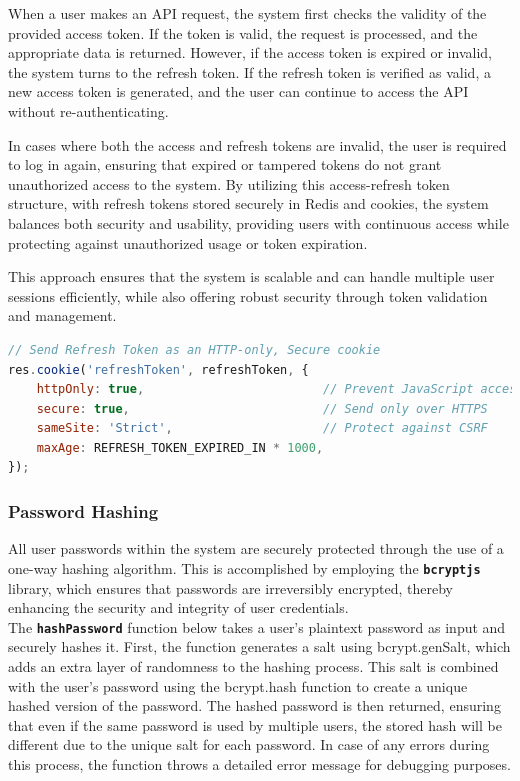 	\noindent When a user makes an API request, the system first checks the validity of the provided access token. If the token is valid, the request is processed, and the appropriate data is returned. However, if the access token is expired or invalid, the system turns to the refresh token. If the refresh token is verified as valid, a new access token is generated, and the user can continue to access the API without re-authenticating.
	
	\noindent In cases where both the access and refresh tokens are invalid, the user is required to log in again, ensuring that expired or tampered tokens do not grant unauthorized access to the system. By utilizing this access-refresh token structure, with refresh tokens stored securely in Redis and cookies, the system balances both security and usability, providing users with continuous access while protecting against unauthorized usage or token expiration.
	
	\noindent This approach ensures that the system is scalable and can handle multiple user sessions efficiently, while also offering robust security through token validation and management.

\begin{lstlisting}[language=Javascript, breaklines=true, caption=Store refresh token in secure cookie]
// Send Refresh Token as an HTTP-only, Secure cookie
res.cookie('refreshToken', refreshToken, {
	httpOnly: true,       					// Prevent JavaScript access to the cookie
	secure: true,         					// Send only over HTTPS
	sameSite: 'Strict',   					// Protect against CSRF
	maxAge: REFRESH_TOKEN_EXPIRED_IN * 1000, 
});
\end{lstlisting}

	\subsubsection{Password Hashing}
	All user passwords within the system are securely protected through the use of a one-way hashing algorithm. This is accomplished by employing the \texttt{\textbf{bcryptjs}} library, which ensures that passwords are irreversibly encrypted, thereby enhancing the security and integrity of user credentials. \\
	
	The \texttt{\textbf{hashPassword}} function below takes a user's plaintext password as input and securely hashes it. First, the function generates a salt using bcrypt.genSalt, which adds an extra layer of randomness to the hashing process. This salt is combined with the user's password using the bcrypt.hash function to create a unique hashed version of the password. The hashed password is then returned, ensuring that even if the same password is used by multiple users, the stored hash will be different due to the unique salt for each password. In case of any errors during this process, the function throws a detailed error message for debugging purposes.
	

